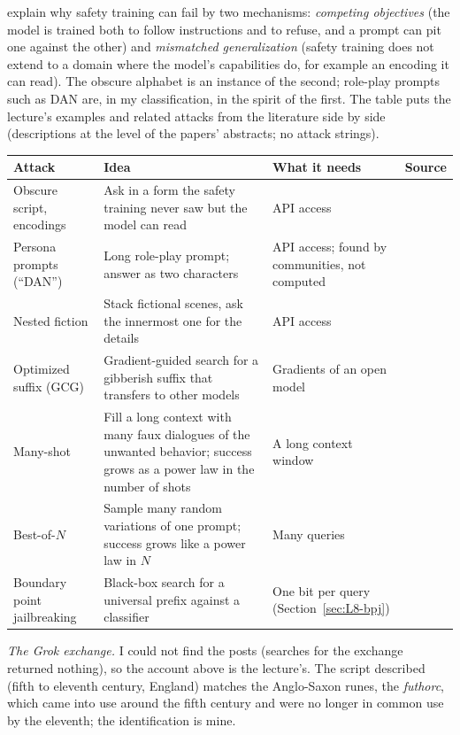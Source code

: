\begin{beyond}
\citet{wei2023jailbroken} explain why safety training can fail by two mechanisms: \emph{competing objectives} (the model is trained both to follow instructions and to refuse, and a prompt can pit one against the other) and \emph{mismatched generalization} (safety training does not extend to a domain where the model's capabilities do, for example an encoding it can read). The obscure alphabet is an instance of the second; role-play prompts such as DAN are, in my classification, in the spirit of the first. The table puts the lecture's examples and related attacks from the literature side by side (descriptions at the level of the papers' abstracts; no attack strings).
\begin{center}\footnotesize
\setlength{\tabcolsep}{4pt}
\renewcommand{\arraystretch}{1.15}
\begin{tabular}{@{}>{\raggedright\arraybackslash}p{24mm}>{\raggedright\arraybackslash}p{38mm}>{\raggedright\arraybackslash}p{26mm}>{\raggedright\arraybackslash}p{22mm}@{}}
\toprule
\textbf{Attack} & \textbf{Idea} & \textbf{What it needs} & \textbf{Source}\\
\midrule
Obscure script, encodings & Ask in a form the safety training never saw but the model can read & API access & \citealp{wei2023jailbroken}\\
Persona prompts (``DAN'') & Long role-play prompt; answer as two characters & API access; found by communities, not computed & \citealp{shen2024dan}\\
Nested fiction & Stack fictional scenes, ask the innermost one for the details & API access & \citealp{li2023deepinception}\\
Optimized suffix (GCG) & Gradient-guided search for a gibberish suffix that transfers to other models & Gradients of an open model & \citealp{zou2023}\\
Many-shot & Fill a long context with many faux dialogues of the unwanted behavior; success grows as a power law in the number of shots & A long context window & \citealp{anil2024}\\
Best-of-$N$ & Sample many random variations of one prompt; success grows like a power law in $N$ & Many queries & \citealp{hughes2024}\\
Boundary point jailbreaking & Black-box search for a universal prefix against a classifier & One bit per query (Section~\ref{sec:L8-bpj}) & \citealp{aisi2026bpj}\\
\bottomrule
\end{tabular}
\end{center}
\emph{The Grok exchange.} I could not find the posts (searches for the exchange returned nothing), so the account above is the lecture's. The script described (fifth to eleventh century, England) matches the Anglo-Saxon runes, the \emph{futhorc}, which came into use around the fifth century and were no longer in common use by the eleventh; the identification is mine.
\end{beyond}

